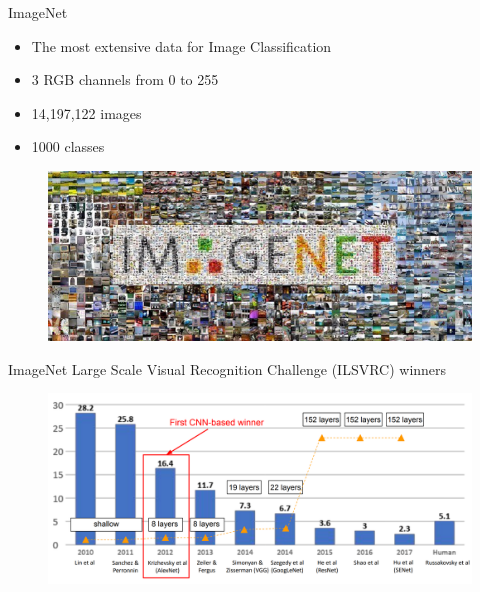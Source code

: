 \documentclass[10pt]{beamer}
\theoremstyle{remark}
\theoremstyle{definition}
\begin{document}
\begin{frame}{ImageNet}
\begin{itemize}
    \item The most extensive data for Image Classification
    \item 3 RGB channels from 0 to 255
    \item 14,197,122 images
    \item 1000 classes
\end{itemize}

\begin{figure}
\centering
\includegraphics[width=1.0\textwidth,height=0.5\textheight,keepaspectratio]{./images/imagenet.png}
\end{figure}
\end{frame}

\begin{frame}{ImageNet Large Scale Visual Recognition Challenge (ILSVRC) winners}
\begin{figure}
\centering
\includegraphics[width=1.0\textwidth,height=1.0\textheight,keepaspectratio]{./images/imagenet_2.png}
\end{figure}

    
\end{frame}
\end{document}
